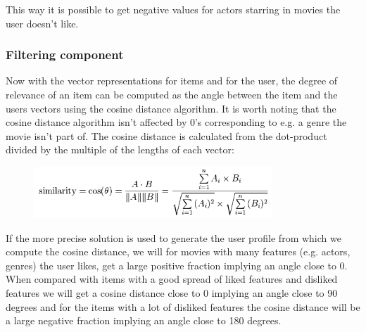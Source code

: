 This way it is possible to get negative values for actors starring in movies the user doesn't like.

 
\subsubsection{Filtering component}

Now with the vector representations for items and for the user, the degree of relevance of an item can be computed as the angle between the item and the users vectors using the cosine distance algorithm. It is worth noting that the cosine distance algorithm isn't affected by 0's corresponding to e.g. a genre the movie isn't part of. The cosine distance is calculated from the dot-product divided by the multiple of the lengths of each vector:

\begin{figure}[H]
\centering
\includegraphics[width=0.8\textwidth]{Images/Cosinesimularity.png}
\caption{}
\label{Cosine}
\end{figure}

If the more precise solution is used to generate the user profile from which we compute the cosine distance, we will for movies with many features (e.g. actors, genres) the user likes, get a large positive fraction implying an angle close to 0. When compared with items with a good spread of liked features and disliked features we will get a cosine distance close to 0 implying an angle close to 90 degrees and for the items with a lot of disliked features the cosine distance will be a large negative fraction implying an angle close to 180 degrees.


